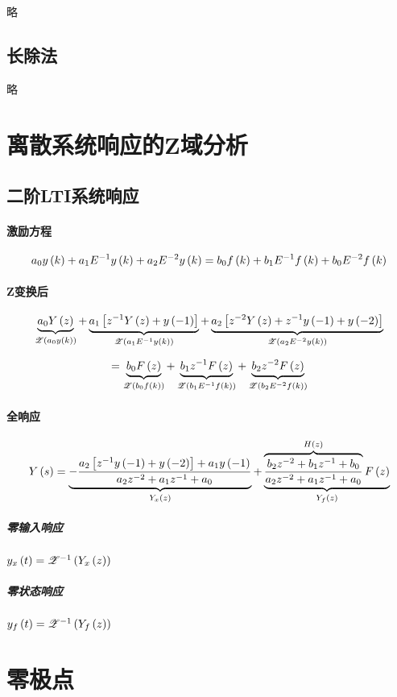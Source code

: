 \documentclass{article}
\begin{document}
略

\subsection{长除法}

略

\section{离散系统响应的Z域分析}

\subsection{二阶LTI系统响应}

\paragraph{激励方程}

\[a_0y\left(k\right)+a_1E^{-1}y\left(k\right)+a_2E^{-2}y\left(k\right)
    =b_0f\left(k\right)+b_1E^{-1}f\left(k\right)+b_0E^{-2}f\left(k\right)\]

\paragraph{Z变换后}

\[\underbrace{a_0Y\left(z\right)}_{\mathscr Z\left(a_0y\left(k\right)\right)}
    +\underbrace{a_1\left[{z^{-1}Y\left(z\right)+y\left(-1\right)}\right]}_{\mathscr Z\left(a_1E^{-1}y\left(k\right)\right)}
    +\underbrace{a_2\left[{z^{-2}Y\left(z\right)+z^{-1}y\left(-1\right)+y\left(-2\right)}\right]}_{\mathscr Z\left(a_2E^{-2}y\left(k\right)\right)}\]

\[=\underbrace{b_0F\left(z\right)}_{\mathscr Z\left(b_0f\left(k\right)\right)}
    +\underbrace{b_1z^{-1}F\left(z\right)}_{\mathscr Z\left(b_1E^{-1}f\left(k\right)\right)}
    +\underbrace{b_2z^{-2}F\left(z\right)}_{\mathscr Z\left(b_2E^{-2}f\left(k\right)\right)}\]

\paragraph{全响应}

\[Y\left(s\right)
    =\underbrace{-\frac{a_2\left[z^{-1}y\left(-1\right)+y\left(-2\right)\right]+a_1y\left(-1\right)}{a_2z^{-2}+a_1z^{-1}+a_0}}_{Y_x\left(z\right)}
    +\underbrace{\overbrace{\frac{b_2z^{-2}+b_1z^{-1}+b_0}{a_2z^{-2}+a_1z^{-1}+a_0}}^{H\left(z\right)}F\left(z\right)}_{Y_f\left(z\right)}\]

\subparagraph{零输入响应}

$y_x\left(t\right)=\mathscr Z^{-1}\left(Y_x\left(z\right)\right)$

\subparagraph{零状态响应}

$y_f\left(t\right)=\mathscr Z^{-1}\left(Y_f\left(z\right)\right)$

\section{零极点}
\end{document}

